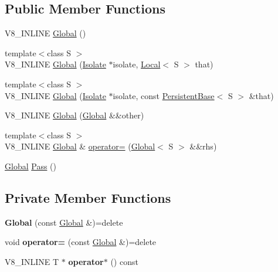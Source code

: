 \subsection*{Public Member Functions}
\begin{DoxyCompactItemize}
\item 
V8\+\_\+\+I\+N\+L\+I\+NE \hyperlink{classv8_1_1_global_ab1efdf25ff6305e67f3266a6fe90527e}{Global} ()
\item 
{\footnotesize template$<$class S $>$ }\\V8\+\_\+\+I\+N\+L\+I\+NE \hyperlink{classv8_1_1_global_a8434bb6729eb4cd0cd85ad81bd8344ad}{Global} (\hyperlink{classv8_1_1_isolate}{Isolate} $\ast$isolate, \hyperlink{classv8_1_1_local}{Local}$<$ S $>$ that)
\item 
{\footnotesize template$<$class S $>$ }\\V8\+\_\+\+I\+N\+L\+I\+NE \hyperlink{classv8_1_1_global_a6243ecb28bb97d066065796fa28f7415}{Global} (\hyperlink{classv8_1_1_isolate}{Isolate} $\ast$isolate, const \hyperlink{classv8_1_1_persistent_base}{Persistent\+Base}$<$ S $>$ \&that)
\item 
V8\+\_\+\+I\+N\+L\+I\+NE \hyperlink{classv8_1_1_global_ab8f3c754a58146e6db67012cd74a49cb}{Global} (\hyperlink{classv8_1_1_global}{Global} \&\&other)
\item 
{\footnotesize template$<$class S $>$ }\\V8\+\_\+\+I\+N\+L\+I\+NE \hyperlink{classv8_1_1_global}{Global} \& \hyperlink{classv8_1_1_global_a9d3d7d8f10ad23e413f2027cc15ab209}{operator=} (\hyperlink{classv8_1_1_global}{Global}$<$ S $>$ \&\&rhs)
\item 
\hyperlink{classv8_1_1_global}{Global} \hyperlink{classv8_1_1_global_a914903149cc752468d4a3a11b6089c7e}{Pass} ()
\end{DoxyCompactItemize}
\subsection*{Private Member Functions}
\begin{DoxyCompactItemize}
\item 
{\bfseries Global} (const \hyperlink{classv8_1_1_global}{Global} \&)=delete\hypertarget{classv8_1_1_global_aefdf6b7bc98d7d011e1381b7cac7fa33}{}\label{classv8_1_1_global_aefdf6b7bc98d7d011e1381b7cac7fa33}

\item 
void {\bfseries operator=} (const \hyperlink{classv8_1_1_global}{Global} \&)=delete\hypertarget{classv8_1_1_global_a732256fcf3edd799c55ba559921dff03}{}\label{classv8_1_1_global_a732256fcf3edd799c55ba559921dff03}

\item 
V8\+\_\+\+I\+N\+L\+I\+NE T $\ast$ {\bfseries operator$\ast$} () const \hypertarget{classv8_1_1_global_ade0e3b9e1084a787fff762e31794e129}{}\label{classv8_1_1_global_ade0e3b9e1084a787fff762e31794e129}

\end{DoxyCompactItemize}
